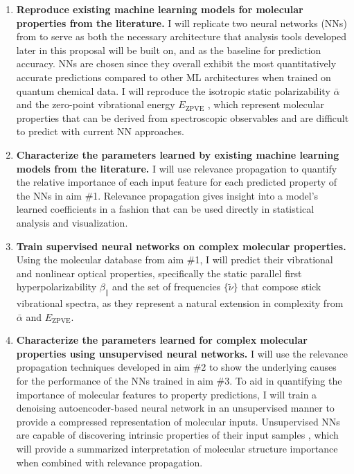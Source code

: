\documentclass[12pt]{article}
\begin{document}
\begin{enumerate}
\item \textbf{Reproduce existing machine learning models for molecular properties from the literature.} I will replicate two neural networks (NNs) from \parencite{2017arXiv170205532F} to serve as both the necessary architecture that analysis tools developed later in this proposal will be built on, and as the baseline for prediction accuracy. NNs are chosen since they overall exhibit the most quantitatively accurate predictions compared to other ML architectures when trained on quantum chemical data. I will reproduce the isotropic static polarizability \(\bar{\alpha}\) \parencite{POC:POC407} and the zero-point vibrational energy \(E_\text{ZPVE}\) \parencite{doi:10.1063/1.2436891}, which represent molecular properties that can be derived from spectroscopic observables and are difficult to predict with current NN approaches.

\item \textbf{Characterize the parameters learned by existing machine learning models from the literature.} I will use relevance propagation \cite{10.1371/journal.pone.0130140,Binder2016,JMLR:v17:15-618} to quantify the relative importance of each input feature for each predicted property of the NNs in aim \#1. Relevance propagation gives insight into a model's learned coefficients in a fashion that can be used directly in statistical analysis and visualization.

\item \textbf{Train supervised neural networks on complex molecular properties.} Using the molecular database from aim \#1, I will predict their vibrational and nonlinear optical properties, specifically the static parallel first hyperpolarizability \(\beta_{\parallel}\) \parencite{doi:10.1063/1.3134744} and the set of frequencies \(\{\tilde{\nu}\}\) that compose stick vibrational spectra, as they represent a natural extension in complexity from \(\bar{\alpha}\) and \(E_{\text{ZPVE}}\).

\item \textbf{Characterize the parameters learned for complex molecular properties using unsupervised neural networks.} I will use the relevance propagation techniques developed in aim \#2 to show the underlying causes for the performance of the NNs trained in aim \#3. To aid in quantifying the importance of molecular features to property predictions, I will train a denoising autoencoder-based neural network in an unsupervised manner to provide a compressed representation of molecular inputs. Unsupervised NNs are capable of discovering intrinsic properties of their input samples \cite{VincentPLarochelleH2008}, which will provide a summarized interpretation of molecular structure importance when combined with relevance propagation.
\end{enumerate}
\end{document}
